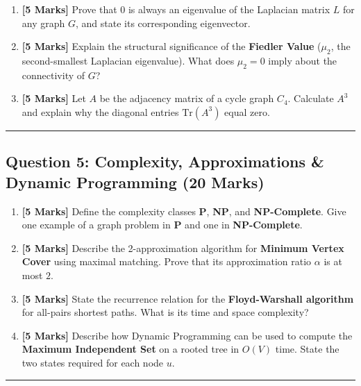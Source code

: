 \documentclass[
]{book}
\providecommand{\tightlist}{%
  \setlength{\itemsep}{0pt}\setlength{\parskip}{0pt}}
\theoremstyle{definition}
\theoremstyle{definition}
\theoremstyle{definition}
\theoremstyle{definition}
\theoremstyle{remark}
\begin{document}
\begin{enumerate}
\def\labelenumi{\arabic{enumi}.}
\setcounter{enumi}{1}
\tightlist
\item
  \textbf{{[}5 Marks{]}} Prove that \(0\) is always an eigenvalue of the Laplacian matrix \(L\) for any graph \(G\), and state its corresponding eigenvector.
\item
  \textbf{{[}5 Marks{]}} Explain the structural significance of the \textbf{Fiedler Value} (\(\mu_2\), the second-smallest Laplacian eigenvalue). What does \(\mu_2 = 0\) imply about the connectivity of \(G\)?
\item
  \textbf{{[}5 Marks{]}} Let \(A\) be the adjacency matrix of a cycle graph \(C_4\). Calculate \(A^3\) and explain why the diagonal entries \(\text{Tr}(A^3)\) equal zero.
\end{enumerate}

\begin{center}\rule{0.5\linewidth}{0.5pt}\end{center}

\subsection{Question 5: Complexity, Approximations \& Dynamic Programming (20 Marks)}\label{question-5-complexity-approximations-dynamic-programming-20-marks}

\begin{enumerate}
\def\labelenumi{\arabic{enumi}.}
\tightlist
\item
  \textbf{{[}5 Marks{]}} Define the complexity classes \textbf{P}, \textbf{NP}, and \textbf{NP-Complete}. Give one example of a graph problem in \textbf{P} and one in \textbf{NP-Complete}.
\item
  \textbf{{[}5 Marks{]}} Describe the 2-approximation algorithm for \textbf{Minimum Vertex Cover} using maximal matching. Prove that its approximation ratio \(\alpha\) is at most \(2\).
\item
  \textbf{{[}5 Marks{]}} State the recurrence relation for the \textbf{Floyd-Warshall algorithm} for all-pairs shortest paths. What is its time and space complexity?
\item
  \textbf{{[}5 Marks{]}} Describe how Dynamic Programming can be used to compute the \textbf{Maximum Independent Set} on a rooted tree in \(O(V)\) time. State the two states required for each node \(u\).
\end{enumerate}

\begin{center}\rule{0.5\linewidth}{0.5pt}\end{center}
\end{document}
